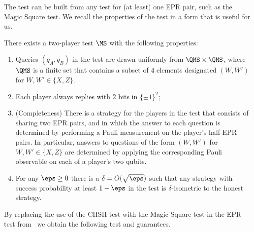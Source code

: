 The test can be built from any test for (at least) one EPR pair, such as the Magic Square test. We recall the properties of the test in a form that is useful for us. 

\begin{theorem}\label{thm:ms-rigid}
There exists a two-player test $\MS$ with the following properties:
\begin{enumerate}
\item Queries $(q_A,q_B)$ in the test are drawn uniformly from $\QMS \times \QMS$, where $\QMS$ is a finite set that contains a subset of $4$ elements designated $(W,W')$ for $W,W'\in\{X,Z\}$. 
\item Each player always replies with $2$ bits in $\{\pm 1\}^2$;
\item (Completeness) There is a strategy for the players in the test that consists of sharing two EPR pairs, and in which the answer to each question is determined by performing a Pauli measurement on the player's half-EPR pairs. In particular, answers to questions of the form $(W,W')$ for $W,W'\in\{X,Z\}$ are determined by applying the corresponding Pauli observable on each of a player's two qubits. 
\item For any $\eps\geq 0$ there is a $\delta = O(\sqrt{\eps})$ such that
   any strategy with success probability at least $1-\eps$ in the test is $\delta$-isometric to the honest strategy. 
\end{enumerate}
\end{theorem}

By replacing the use of the CHSH test with the Magic Square test in the EPR test from~\cite{chao2016test} we obtain the following test and guarantees. 

